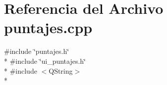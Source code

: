 \section{Referencia del Archivo puntajes.\-cpp}
\label{puntajes_8cpp}
{\ttfamily \#include \char`\"{}puntajes.\-h\char`\"{}}\\*
{\ttfamily \#include \char`\"{}ui\-\_\-puntajes.\-h\char`\"{}}\\*
{\ttfamily \#include $<$Q\-String$>$}\\*
